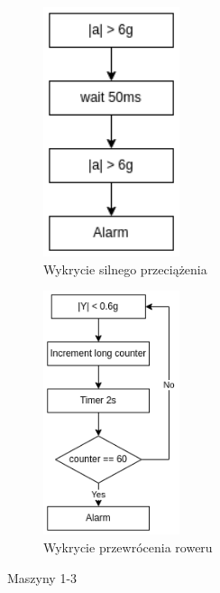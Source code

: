 \begin{figure}[h]
    \centering
    \begin{subfigure}{4cm}
    \includegraphics[width=4cm]{Graphics/All_axis_FSM1.png}
    \caption{Wykrycie silnego przeciążenia}
    \label{img:fsm1}
    \end{subfigure}

    \begin{subfigure}{4cm}
    \includegraphics[width=4cm]{Graphics/overturned_FSM2_3.png}
    \caption{Wykrycie przewrócenia roweru}
    \label{img:fsm2}
    \end{subfigure}
    \caption{Maszyny 1-3}
\end{figure}